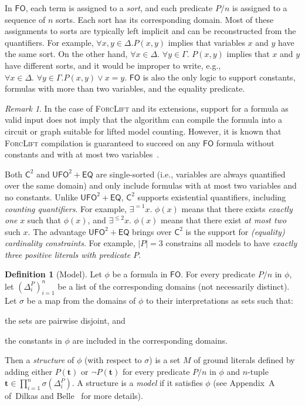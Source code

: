 \documentclass{article}
\theoremstyle{definition}
\newtheorem{definition}{Definition}
\theoremstyle{remark}
\newtheorem*{remark}{Remark}
\newcommand{\Ctwo}{$\mathsf{C}^{2}$}
\newcommand{\FO}{$\mathsf{FO}$}
\newcommand{\UFO}{$\mathsf{UFO}^{2} + \mathsf{EQ}$}
\begin{document}
In \FO{}, each term is assigned to a \emph{sort}, and each predicate $P/n$ is
assigned to a sequence of $n$ sorts. Each sort has its corresponding domain.
Most of these assignments to sorts are typically left implicit and can be
reconstructed from the quantifiers. For example, $\forall x,y \in \Delta\text{.
}P(x, y)$ implies that variables $x$ and $y$ have the same sort. On the other
hand, $\forall x \in \Delta\text{. }\forall y \in \Gamma\text{. } P(x, y)$
implies that $x$ and $y$ have different sorts, and it would be improper to
write, e.g., $\forall x \in \Delta\text{. }\forall y \in \Gamma\text{.
} P(x, y) \lor x = y$. \FO{} is also the only logic to support constants,
formulas with more than two variables, and the equality predicate.

\begin{remark}
  In the case of \textsc{ForcLift} and its extensions, support for a formula as
  valid input does not imply that the algorithm can compile the formula into a
  circuit or graph suitable for lifted model counting. However, it is known that
  \textsc{ForcLift} compilation is guaranteed to succeed on any \FO{} formula
  without constants and with at most two
  variables~\cite{DBLP:conf/nips/Broeck11}.
\end{remark}

Both \Ctwo{} and \UFO{} are single-sorted (i.e., variables are always quantified
over the same domain) and only include formulas with at most two variables and
no constants. Unlike \UFO{}, \Ctwo{} supports existential quantifiers, including
\emph{counting quantifiers}. For example, $\exists^{=1} x\text{. }\phi(x)$ means
that there exists \emph{exactly one} $x$ such that $\phi(x)$, and
$\exists^{\le 2} x\text{. }\phi(x)$ means that there exist \emph{at most two}
such $x$. The advantage \UFO{} brings over \Ctwo{} is the support for
\emph{(equality) cardinality constraints}. For example, $|P| = 3$ constrains all
models to have \emph{exactly three positive literals with predicate $P$}.

\begin{definition}[Model]\label{def:model}
  Let $\phi$ be a formula in \FO{}. For every predicate $P/n$ in $\phi$, let
  ${(\Delta_{i}^{P})}_{i=1}^{n}$ be a list of the corresponding domains (not
  necessarily distinct). Let $\sigma$ be a map from the domains of $\phi$ to
  their interpretations as sets such that:
  \begin{enumerate*}[label=(\roman*)]
    \item the sets are pairwise disjoint, and
    \item the constants in $\phi$ are included in the corresponding domains.
  \end{enumerate*}
  Then a \emph{structure} of $\phi$ (with respect to $\sigma$) is a set $M$ of
  ground literals defined by adding either $P(\mathbf{t})$ or
  $\neg P(\mathbf{t})$ for every predicate $P/n$ in $\phi$ and $n$-tuple
  $\mathbf{t} \in \prod_{i=1}^{n} \sigma(\Delta_{i}^{P})$. A structure is a
  \emph{model} if it satisfies $\phi$ (see Appendix~A of~Dilkas and
  Belle~ for more details).
\end{definition}
\end{document}
